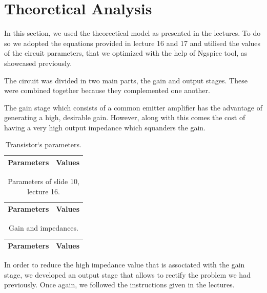 \section{Theoretical Analysis}
\label{sec:analysis}

In this section, we used the theorectical model as presented in the lectures. To do so we adopted the equations provided in lecture 16 and 17 and utilised the values of the circuit parameters, that we optimized with the help of Ngspice tool, as showcased previously.

The circuit was divided in two main parts, the gain and output stages. These were combined together because they complemented one another.

The gain stage which consists of a common emitter amplifier has the advantage of generating a high, desirable gain. However, along with this comes the cost of having a very high output impedance which squanders the gain.

\begin{table}[h]
  \centering
  \begin{tabular}{|l|r|}
    \hline    
    {\bf Parameters} & {\bf Values} \\ \hline
    
  \end{tabular}
  \caption{Transistor`s parameters.}
  \label{tab:1}
\end{table}

\begin{table}[h]
  \centering
  \begin{tabular}{|l|r|}
    \hline    
    {\bf Parameters} & {\bf Values} \\ \hline
    
  \end{tabular}
  \caption{Parameters of slide 10, lecture 16.}
  \label{tab:2}
\end{table}

\begin{table}[h]
  \centering
  \begin{tabular}{|l|r|}
    \hline    
    {\bf Parameters} & {\bf Values} \\ \hline
    
  \end{tabular}
  \caption{Gain and impedances.}
  \label{tab:3}
\end{table}


In order to reduce the high impedance value that is associated with the gain stage, we developed an output stage that allows to rectify the problem we had previously. Once again, we followed the instructions given in the lectures.


